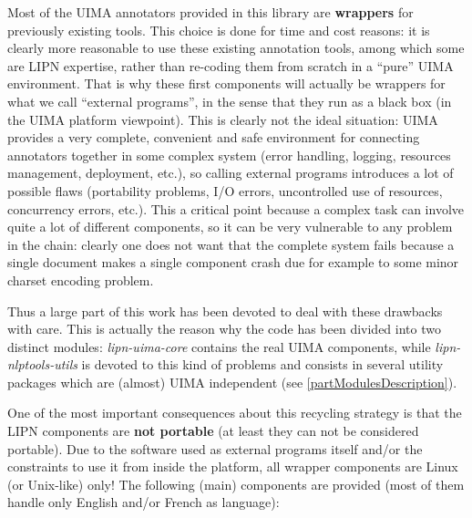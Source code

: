 \documentclass{article}
\newcommand{\uimaModule}{{\em lipn-uima-core}\xspace}
\newcommand{\utilsModule}{{\em lipn-nlptools-utils}\xspace}
\begin{document}
Most of the UIMA annotators provided in this library are {\bf wrappers} for previously existing tools. This choice is done for time and cost reasons: it is clearly more reasonable to use these existing annotation tools, among which some are LIPN expertise, rather than re-coding them from scratch in a ``pure'' UIMA environment. That is why these first components will actually be wrappers for what we call ``external programs'', in the sense that they run as a black box (in the UIMA platform viewpoint). This is clearly not the ideal situation: UIMA provides a very complete, convenient and safe environment for connecting annotators together in some complex system (error handling, logging, resources management, deployment, etc.), so calling external programs introduces a lot of possible flaws (portability problems, I/O errors, uncontrolled use of resources, concurrency errors, etc.). This a critical point because a complex task can involve quite a lot of different components, so it can be very vulnerable to any problem in the chain: clearly one does not want that the complete system fails because a single document makes a single component crash due for example to some minor charset encoding problem. 

Thus a large part of this work has been devoted to deal with these drawbacks with care. This is actually the reason why the code has been divided into two distinct modules: \uimaModule contains the real UIMA components, while \utilsModule is devoted to this kind of problems and consists in several utility packages which are (almost) UIMA independent (see \ref{partModulesDescription}).

One of the most important consequences about this recycling strategy is that the LIPN components are {\bf not portable} (at least they can not be considered portable). Due to the software used as external programs itself and/or the constraints to use it from inside the platform, all wrapper components are Linux (or Unix-like) only! The following (main) components are provided (most of them handle only English and/or French as language):
\end{document}
